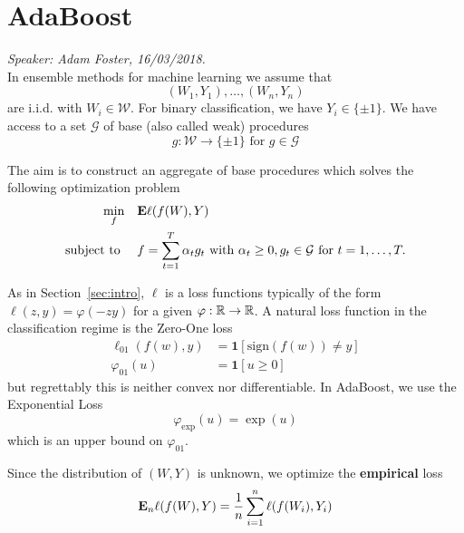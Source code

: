 
\chapter{AdaBoost}
\emph{Speaker: Adam Foster, 16/03/2018.}\\

In ensemble methods for machine learning we assume that
\begin{equation*}
	(W_1, Y_1), \dots, (W_n, Y_n)
\end{equation*}
are i.i.d. with $W_i \in \mathcal{W}$. For binary classification, we have $Y_i \in \{\pm 1\}$. We have access to a set $\mathcal{G}$ of base (also called weak) procedures
\begin{equation*}
	g: \mathcal{W} \to \{\pm 1\} \text{ for } g \in \mathcal{G}
\end{equation*}

The aim is to construct an aggregate of base procedures which solves the following optimization problem
\begin{align*}
	\begin{aligned}
		\min_f\quad   & \mathbf{E} \ell(f(W), Y) \\
		\text{subject to }\quad & f = \sum_{t=1}^T \alpha_t g_t \text{ with } \alpha_t \ge 0, g_t \in \mathcal{G} \text{ for } t=1, \dots, T.
	\end{aligned}
\end{align*}

As in Section~\ref{sec:intro}, $\ell$ is a loss functions typically of the form $\ell(z,y) = \varphi(-zy)$ for a given $\varphi:\mathbb{R}\rightarrow\mathbb{R}$. A natural loss function in the classification regime is the Zero-One loss
\begin{align*}
	\ell_{01}(f(w), y) &= \mathbf{1}[\text{sign}(f(w)) \ne y] \\
	\varphi_{01}(u)    &= \mathbf{1}[u \ge 0]
\end{align*}
but regrettably this is neither convex nor differentiable. In AdaBoost, we use the Exponential Loss
\begin{equation*}
	\varphi_\text{exp}(u) = \exp(u)
\end{equation*}
which is an upper bound on $\varphi_{01}$.

Since the distribution of $(W, Y)$ is unknown, we optimize the \textbf{empirical} loss
\begin{equation*}
	\mathbf{E}_n \ell(f(W), Y) = \frac{1}{n} \sum_{i=1}^n \ell(f(W_i), Y_i)
\end{equation*}


